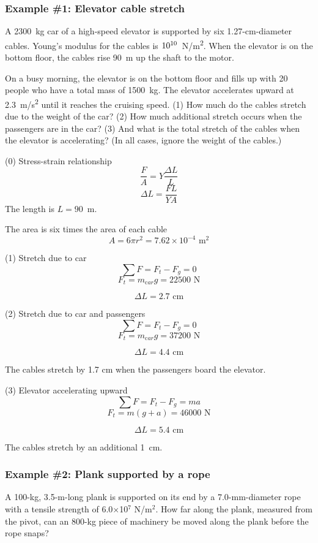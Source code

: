 \subsubsection*{Example \#1: Elevator cable stretch}
A 2300~kg car of a high-speed elevator is supported by six 1.27-cm-diameter cables. Young's modulus for the cables is $10\time10^{10}$~N/m\textsuperscript{2}. When the elevator is on the bottom floor, the cables rise 90~m up the shaft to the motor.

On a busy morning, the elevator is on the bottom floor and fills up with 20 people who have a total mass of 1500~kg. The elevator accelerates upward at 2.3~m/s\textsuperscript{2} until it reaches the cruising speed. (1) How much do the cables stretch due to the weight of the car? (2) How much additional stretch occurs when the passengers are in the car? (3) And what is the total stretch of the cables when the elevator is accelerating? (In all cases, ignore the weight of the cables.)

\vspace{4cm}

(0) Stress-strain relationship
$$\frac{F}{A} = Y\frac{\Delta L}{L}$$
$$\Delta L = \frac{FL}{YA}$$
The length is $L=90$~m.

The area is six times the area of each cable
$$A = 6\pi r^2 = 7.62\times 10^{-4}\mbox{ m}^2$$

(1) Stretch due to car
$$\sum F = F_t - F_g = 0$$
$$F_t = m_{\mathrm car}g = 22500\mbox{ N}$$

$$\boxed{\Delta L = 2.7\mbox{ cm}}$$

(2) Stretch due to car and passengers
$$\sum F = F_t - F_g = 0$$
$$F_t = m_{\mathrm car}g = 37200\mbox{ N}$$

$$\boxed{\Delta L = 4.4\mbox{ cm}}$$

The cables stretch by 1.7 cm when the passengers board the elevator.

(3) Elevator accelerating upward
$$\sum F = F_t - F_g = ma$$
$$F_t = m(g+a) = 46000\mbox{ N}$$

$$\boxed{\Delta L = 5.4\mbox{ cm}}$$

The cables stretch by an additional 1~cm.


\subsubsection*{Example \#2: Plank supported by a rope}
A 100-kg, 3.5-m-long plank is supported on its end by a 7.0-mm-diameter rope with a tensile strength of 6.0$\times$10$^7$ N/m$^2$. How far along the plank, measured from the pivot, can an 800-kg piece of machinery be moved along the plank before the rope snaps?

